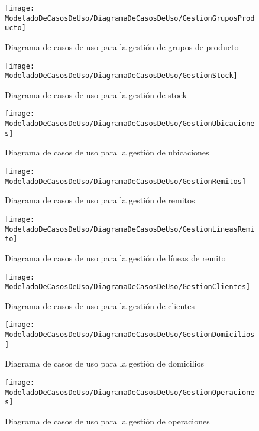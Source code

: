     \begin{figure}[H]
		\centering
		\texttt{[image: ModeladoDeCasosDeUso/DiagramaDeCasosDeUso/GestionGruposProducto]}
		\caption{Diagrama de casos de uso para la gestión de grupos de producto}
	\label{fig:GestionGruposProducto}
	\end{figure}
	\begin{figure}[H]
		\centering
		\texttt{[image: ModeladoDeCasosDeUso/DiagramaDeCasosDeUso/GestionStock]}
		\caption{Diagrama de casos de uso para la gestión de stock}
	\label{fig:GestionStock}
	\end{figure}
	\begin{figure}[H]
		\centering
		\texttt{[image: ModeladoDeCasosDeUso/DiagramaDeCasosDeUso/GestionUbicaciones]}
		\caption{Diagrama de casos de uso para la gestión de ubicaciones}
	\label{fig:GestionUbicaciones}
    \end{figure}
	\begin{figure}[H]
		\centering
		\texttt{[image: ModeladoDeCasosDeUso/DiagramaDeCasosDeUso/GestionRemitos]}
		\caption{Diagrama de casos de uso para la gestión de remitos}
	\label{fig:GestionRemitos}
	\end{figure}
	\begin{figure}[H]
		\centering
		\texttt{[image: ModeladoDeCasosDeUso/DiagramaDeCasosDeUso/GestionLineasRemito]}
		\caption{Diagrama de casos de uso para la gestión de líneas de remito}
	\label{fig:GestionLineasRemito}
    \end{figure}
    \begin{figure}[H]
		\centering
		\texttt{[image: ModeladoDeCasosDeUso/DiagramaDeCasosDeUso/GestionClientes]}
		\caption{Diagrama de casos de uso para la gestión de clientes}
	\label{fig:GestionClientes}
	\end{figure}
	\begin{figure}[H]
		\centering
		\texttt{[image: ModeladoDeCasosDeUso/DiagramaDeCasosDeUso/GestionDomicilios]}
		\caption{Diagrama de casos de uso para la gestión de domicilios}
	\label{fig:GestionDomicilios}
	\end{figure}
	\begin{figure}[H]
		\centering
		\texttt{[image: ModeladoDeCasosDeUso/DiagramaDeCasosDeUso/GestionOperaciones]}
		\caption{Diagrama de casos de uso para la gestión de operaciones}
	\label{fig:GestionOperaciones}
	\end{figure}
